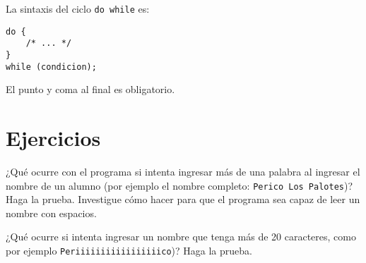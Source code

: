 La sintaxis del ciclo \lstinline!do while! es:

\begin{lstlisting}
do {
    /* ... */
}
while (condicion);
\end{lstlisting}

El punto y coma al final es obligatorio.

\section{Ejercicios}

¿Qué ocurre con el programa si intenta ingresar más de una palabra al
ingresar el nombre de un alumno (por ejemplo el nombre completo:
\lstinline!Perico Los Palotes!)? Haga la prueba. Investigue cómo hacer
para que el programa sea capaz de leer un nombre con espacios.

¿Qué ocurre si intenta ingresar un nombre que tenga más de 20
caracteres, como por ejemplo \lstinline!Periiiiiiiiiiiiiiiiico!)? Haga
la prueba.

